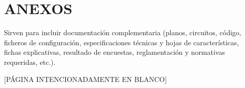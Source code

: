 \documentclass[11pt,a4paper]{report}
\begin{document}
\renewcommand{\bibname}{REFERENCIAS}




\chapter*{ANEXOS}
Sirven para incluir documentaci\'on complementaria (planos, circuitos, c\'odigo, ficheros de configuraci\'on, especificaciones t\'ecnicas y hojas de caracter\'isticas, fichas explicativas, resultado de encuestas, reglamentaci\'on y normativas requeridas, etc.).

\clearpage
\thispagestyle{empty}
\vspace*{\fill}
\begin{center}
[P\'AGINA INTENCIONADAMENTE EN BLANCO]
\end{center}
\vspace*{\fill}

\end{document}
